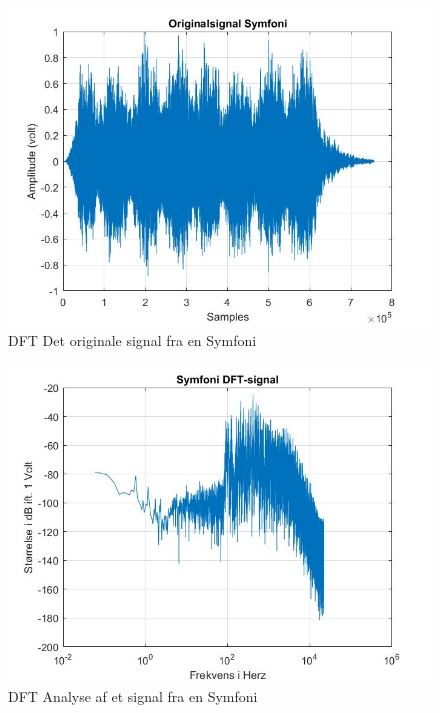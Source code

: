\begin{figure}[H]
	\centering
	\includegraphics[width=180mm]{figures/Symfoni/original.jpg}
	\caption{DFT Det originale signal fra en Symfoni}
	\label{fig:Symfoni original}
\end{figure}

\begin{figure}[H]
	\centering
	\includegraphics[width=180mm]{figures/Symfoni/DFT.jpg}
	\caption{DFT Analyse af et signal fra en Symfoni}
	\label{fig:Symfoni DFT}
\end{figure}

